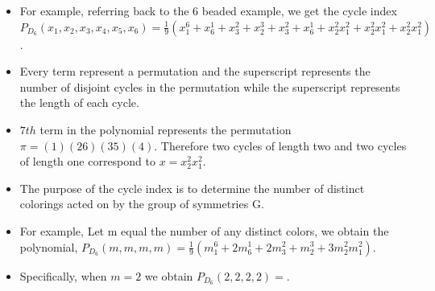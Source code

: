 \documentclass{beamer}
\begin{document}
\begin{frame}
\begin{itemize}
\item For example, referring back to the 6 beaded example, we get the cycle index $P_{D_{6}}(x_{1},x_{2},x_{3},x_{4},x_{5},x_{6})=\frac{1}{9}(x_{1}^{6} + x_{6}^{1} + x_{3}^{2} + x_{2}^{3} + x_{3}^{2} + x_{6}^{1} + x_{2}^{2}x_{1}^{2} + x_{2}^{2}x_{1}^{2} + x_{2}^{2}x_{1}^{2})$.

\item Every term represent a permutation and the superscript represents the number of disjoint cycles in the permutation while the superscript represents the length of each cycle.

\item $7th$ term in the polynomial represents the permutation ${\pi} = (1)(26)(35)(4)$. Therefore two cycles of length two and two cycles of length one correspond to $x = x_{2}^{2}x_{1}^{2}$.


\end{itemize}
\end{frame}


\begin{frame}
\begin{itemize}

\item The purpose of the cycle index is to determine the number of distinct colorings acted on by the group of symmetries G.

\item For example, Let m equal the number of any distinct colors, we obtain the polynomial, $P_{D_{6}}(m,m,m,m)=\frac{1}{9}(m_{1}^{6} + 2m_{6}^{1} + 2m_{3}^{2} + m_{2}^{3} + 3m_{2}^{2}m_{1}^{2})$.

\item Specifically, when $m=2$ we obtain $P_{D_{6}}(2,2,2,2)=$.

\end{itemize}
\end{frame}


\end{document}
